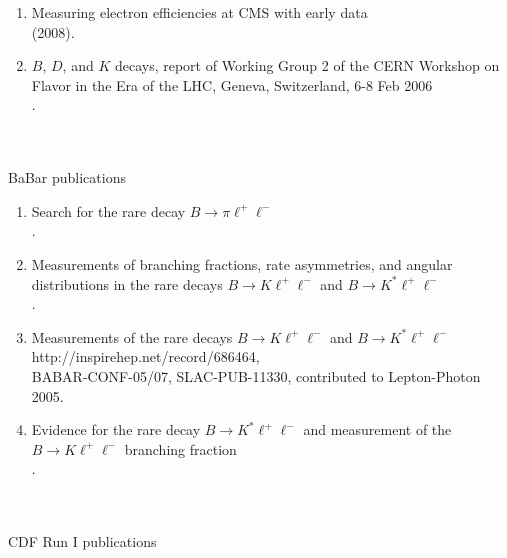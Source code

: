\documentclass [12pt]{report}
\begin{document}
\begin{enumerate}
\item Measuring electron efficiencies at CMS with early data\\
 (2008).

\item $B$, $D$, and $K$ decays, report of Working Group 2 of the CERN Workshop on Flavor in the Era of the LHC, Geneva, Switzerland, 6-8 Feb 2006\\
.

\end{enumerate}
\\ \\
BaBar publications 

\begin{enumerate}

\item Search for the rare decay $B\rightarrow \pi\ell^+\ell^-$\\
.

\item Measurements of branching fractions, rate asymmetries, and angular distributions in the rare decays $B\rightarrow K\ell^+\ell^-$ and $B\rightarrow K^{*}\ell^+\ell^-$\\
.

\item Measurements of the rare decays $B\rightarrow K\ell^+\ell^-$ and $B\rightarrow K^{*}\ell^+\ell^-$\\
{http://inspirehep.net/record/686464}, \\ BABAR-CONF-05/07, SLAC-PUB-11330, contributed to Lepton-Photon 2005.

\item Evidence for the rare decay $B\rightarrow K^{*} \ell^+\ell^-$ and measurement of the $B\rightarrow K\ell^+\ell^-$ branching fraction \\
.

\end{enumerate}
\\ \\
CDF Run I publications
\end{document}
